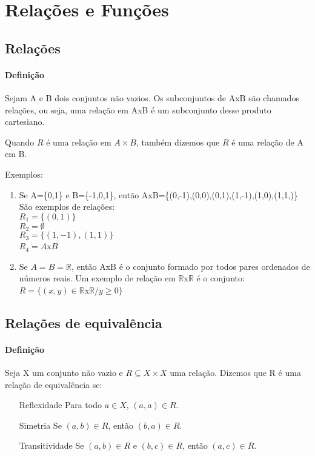 \chapter{Rela{\c c}{\~o}es e Fun{\c c}{\~o}es}
\section{Rela{\c c}{\~o}es}
\subsubsection{Defini{\c c}{\~a}o}
Sejam A e B dois conjuntos n{\~a}o vazios. Os subconjuntos de AxB s{\~a}o chamados rela{\c c}{\~o}es, ou seja, uma rela{\c c}{\~a}o em AxB {\'e} um subconjunto desse produto cartesiano.

Quando $R$ {\'e} uma rela{\c c}{\~a}o em $A \times B$, tamb{\'e}m dizemos que $R$ {\'e} uma rela{\c c}{\~a}o de A em B.

Exemplos:
\begin{enumerate}
\item Se A=\{0,1\} e B=\{-1,0,1\}, ent{\~a}o AxB=\{(0,-1),(0,0),(0,1),(1,-1),(1,0),(1,1,)\}\\
S{\~a}o exemplos de rela{\c c}{\~o}es:\\
$R_{1}=\{(0,1)\}$\\
$R_{2}=\emptyset$\\
$R_{3}=\{(1,-1),(1,1)\}$\\
$R_{4}=A$x$B$
\item Se $A=B=\mathbb{R}$, ent{\~a}o AxB {\'e} o conjunto formado por todos pares ordenados de n{\'u}meros reais. Um exemplo de rela{\c c}{\~a}o em $\mathbb{R}$x$\mathbb{R}$ {\'e} o conjunto:\\
$R=\{(x,y)\in \mathbb{R}$x$\mathbb{R}/ y\geq 0\}$
\end{enumerate}

\section{Rela{\c c}{\~o}es de equival{\^e}ncia}
\subsubsection{Defini{\c c}{\~a}o}
\begin{definicao} Seja X um conjunto n{\~a}o vazio e $R\subseteq X \times X$ uma rela{\c c}{\~a}o. Dizemos que R {\'e} uma rela{\c c}{\~a}o de equival{\^e}ncia se:
\begin{enumerate}
\item[Reflexidade] Para todo $a \in X$, $(a,a)\in R$.
\item[Simetria] Se $(a, b) \in R$, então $(b, a) \in R$.
\item[Transitividade] Se $(a, b) \in R$ e $(b, c) \in R$, então $(a, c)\in R$.
\end{enumerate}
\end{definicao}

